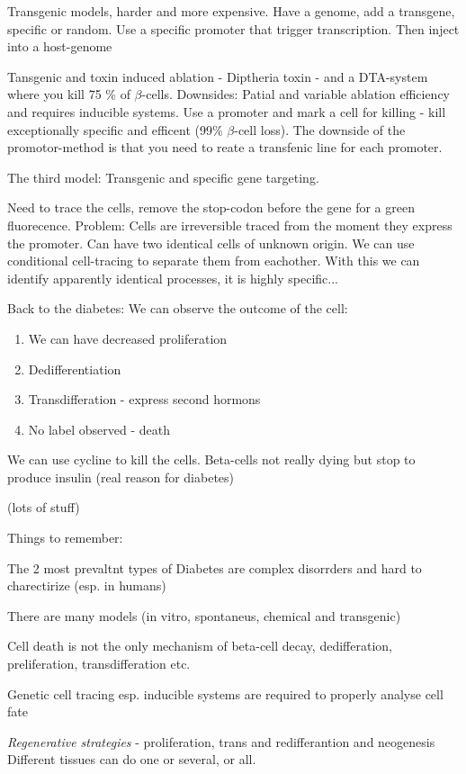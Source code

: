 \documentclass[12p]{article}
\begin{document}
Transgenic models, harder and more expensive.
Have a genome, add a transgene, specific or random. 
Use a specific promoter that trigger transcription. 
Then inject into a host-genome

Tansgenic and toxin induced ablation - Diptheria toxin - and a DTA-system where you kill 75 \% of $\beta$-cells.
Downsides: Patial and variable ablation efficiency and requires inducible systems.
Use a promoter and mark a cell for killing - kill exceptionally specific and efficent (99\% $\beta$-cell loss).
The downside of the promotor-method is that you need to reate a transfenic line for each promoter.

The third model: Transgenic and specific gene targeting.

Need to trace the cells, remove the stop-codon before the gene for a green fluorecence.
Problem: Cells are irreversible traced from the moment they express the promoter.
Can have two identical cells of unknown origin.
We can use conditional cell-tracing to separate them from eachother.
With this we can identify apparently identical processes, it is highly specific...

Back to the diabetes:
We can observe the outcome of the cell:

\begin{enumerate}
	\item
	    We can have decreased proliferation
	\item
	    Dedifferentiation
	\item
	    Transdifferation - express second hormons
	\item
	    No label observed - death
\end{enumerate}

We can use cycline to kill the cells.
Beta-cells not really dying but stop to produce insulin (real reason for diabetes)

(lots of stuff)

Things to remember:

The 2 most prevaltnt types of Diabetes are complex disorrders and hard to charectirize (esp. in humans)

There are many models (in vitro, spontaneus, chemical and transgenic)

Cell death is not the only mechanism of beta-cell decay, dedifferation, preliferation, transdifferation etc.

Genetic cell tracing esp. inducible systems are required to properly analyse cell fate

\emph{Regenerative strategies} - proliferation, trans and redifferantion and neogenesis
Different tissues can do one or several, or all.
\end{document}
